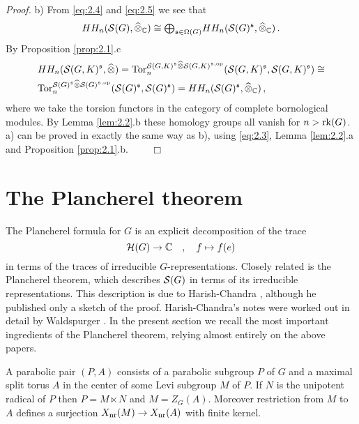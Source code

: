 \emph{Proof.}
b) From \eqref{eq:2.4} and \eqref{eq:2.5} we see that
\begin{equation}
HH_n (\mathcal S (G),\widehat{\otimes}_{\mathbb C} ) \cong {\textstyle\bigoplus_{\mathfrak s \in \Omega (G)} }
HH_n (\mathcal S (G)^{\mathfrak s},\widehat{\otimes}_{\mathbb C} ) \,.
\end{equation}
By Proposition \ref{prop:2.1}.c
\begin{equation}
\begin{split}
& HH_n (\mathcal S (G,K)^{\mathfrak s},\widehat{\otimes}) = \mathrm{Tor}_n^{\mathcal S (G,K)^{\mathfrak s} \widehat{\otimes} 
\mathcal S (G,K)^{\mathfrak s,\mathrm{op}}} (\mathcal S (G,K)^{\mathfrak s}, \mathcal S (G,K)^{\mathfrak s}) \cong \\
& \mathrm{Tor}_n^{\mathcal S (G)^{\mathfrak s} \widehat{\otimes} \mathcal S (G)^{\mathfrak s,\mathrm{op}}}
(\mathcal S (G)^{\mathfrak s}, \mathcal S (G)^{\mathfrak s}) = HH_n (\mathcal S (G)^{\mathfrak s},\widehat{\otimes}_{\mathbb C} ) \,,
\end{split}
\end{equation}
where we take the torsion functors in the category of complete
bornological modules. By Lemma \ref{lem:2.2}.b these homology
groups all vanish for $n > \mathrm{rk}(G)$.\\
a) can be proved in exactly the same way as b), using \eqref{eq:2.3}, 
Lemma \ref{lem:2.2}.a and Proposition \ref{prop:2.1}.b. $ \qquad \Box$ 
\vspace{4mm}





\section{The Plancherel theorem}
\label{sec:2.2}

The Plancherel formula for $G$ is an explicit decomposition of the trace
\[
\mathcal H (G) \to \mathbb C \quad,\quad f \mapsto f (e)
\]
in terms of the traces of irreducible $G$-representations. Closely
related is the Plan\-che\-rel theorem, which describes $\mathcal S (G)$ in
terms of its irreducible representations. This description is due
to Harish-Chandra \cite{HC1,HC2}, although he published only a
sketch of the proof. Harish-Chandra's notes were worked out in
detail by Waldspurger \cite{Wal}. In the present section we recall the
most important ingredients of the Plancherel theorem, relying
almost entirely on the above papers.

A parabolic pair $(P,A)$ consists of a parabolic subgroup $P$ of
$G$ and a maximal split torus $A$ in
the center of some Levi subgroup $M$ of $P$. If $N$ is the
unipotent radical of $P$ then $P = M \ltimes N$ and $M = Z_G (A)$.
Moreover restriction from $M$ to $A$ defines a surjection
$X_{\mathrm{nr}} (M) \to X_{\mathrm{nr}} (A)$ with finite kernel.

